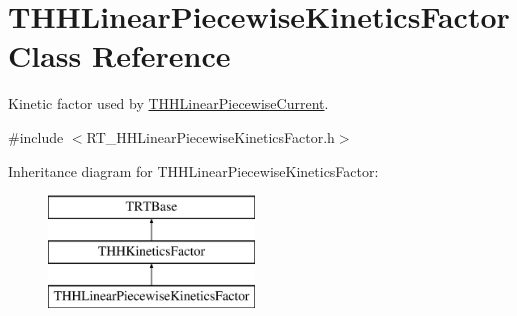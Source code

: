 \hypertarget{class_t_h_h_linear_piecewise_kinetics_factor}{\section{T\+H\+H\+Linear\+Piecewise\+Kinetics\+Factor Class Reference}
\label{class_t_h_h_linear_piecewise_kinetics_factor}
}


Kinetic factor used by \hyperlink{class_t_h_h_linear_piecewise_current}{T\+H\+H\+Linear\+Piecewise\+Current}.  




{\ttfamily \#include $<$R\+T\+\_\+\+H\+H\+Linear\+Piecewise\+Kinetics\+Factor.\+h$>$}

Inheritance diagram for T\+H\+H\+Linear\+Piecewise\+Kinetics\+Factor\+:\begin{figure}[H]
\begin{center}
\leavevmode
\includegraphics[height=3.000000cm]{class_t_h_h_linear_piecewise_kinetics_factor}
\end{center}
\end{figure}
